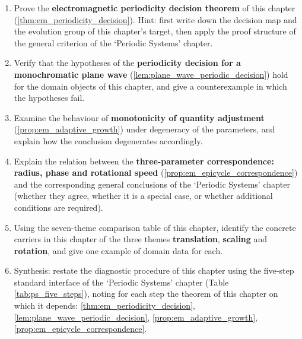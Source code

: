 \begin{enumerate}[leftmargin=3em, label=\textbf{Exercise \arabic*}]
    \item Prove the \textbf{electromagnetic periodicity decision theorem} of this chapter (\ref{thm:em_periodicity_decision}). Hint: first write down the decision map and the evolution group of this chapter's target, then apply the proof structure of the general criterion of the `Periodic Systems' chapter.

    \item Verify that the hypotheses of the \textbf{periodicity decision for a monochromatic plane wave} (\ref{lem:plane_wave_periodic_decision}) hold for the domain objects of this chapter, and give a counterexample in which the hypotheses fail.

    \item Examine the behaviour of \textbf{monotonicity of quantity adjustment} (\ref{prop:em_adaptive_growth}) under degeneracy of the parameters, and explain how the conclusion degenerates accordingly.

    \item Explain the relation between the \textbf{three-parameter correspondence: radius, phase and rotational speed} (\ref{prop:em_epicycle_correspondence}) and the corresponding general conclusions of the `Periodic Systems' chapter (whether they agree, whether it is a special case, or whether additional conditions are required).

    \item Using the seven-theme comparison table of this chapter, identify the concrete carriers in this chapter of the three themes \textbf{translation}, \textbf{scaling} and \textbf{rotation}, and give one example of domain data for each.

    \item Synthesis: restate the diagnostic procedure of this chapter using the five-step standard interface of the `Periodic Systems' chapter (Table \ref{tab:ps_five_steps}), noting for each step the theorem of this chapter on which it depends: \ref{thm:em_periodicity_decision}, \ref{lem:plane_wave_periodic_decision}, \ref{prop:em_adaptive_growth}, \ref{prop:em_epicycle_correspondence}.
\end{enumerate}


